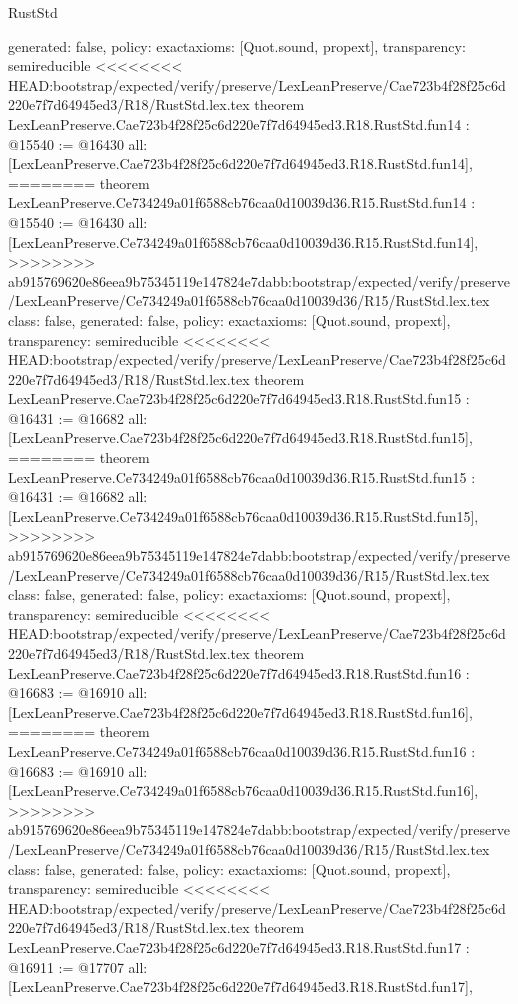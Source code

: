 \begin{lexlean}{RustStd}
\begin{coremodule}
{\begin{coremodule}
{{{{{{{{{{{{{{{{{  generated: false,
  policy: exact{axioms: [Quot.sound, propext]},
  transparency: semireducible
}
<<<<<<<< HEAD:bootstrap/expected/verify/preserve/LexLeanPreserve/Cae723b4f28f25c6d220e7f7d64945ed3/R18/RustStd.lex.tex
theorem LexLeanPreserve.Cae723b4f28f25c6d220e7f7d64945ed3.R18.RustStd.fun14 : @15540 := @16430 {
  all: [LexLeanPreserve.Cae723b4f28f25c6d220e7f7d64945ed3.R18.RustStd.fun14],
========
theorem LexLeanPreserve.Ce734249a01f6588cb76caa0d10039d36.R15.RustStd.fun14 : @15540 := @16430 {
  all: [LexLeanPreserve.Ce734249a01f6588cb76caa0d10039d36.R15.RustStd.fun14],
>>>>>>>> ab915769620e86eea9b75345119e147824e7dabb:bootstrap/expected/verify/preserve/LexLeanPreserve/Ce734249a01f6588cb76caa0d10039d36/R15/RustStd.lex.tex
  class: false,
  generated: false,
  policy: exact{axioms: [Quot.sound, propext]},
  transparency: semireducible
}
<<<<<<<< HEAD:bootstrap/expected/verify/preserve/LexLeanPreserve/Cae723b4f28f25c6d220e7f7d64945ed3/R18/RustStd.lex.tex
theorem LexLeanPreserve.Cae723b4f28f25c6d220e7f7d64945ed3.R18.RustStd.fun15 : @16431 := @16682 {
  all: [LexLeanPreserve.Cae723b4f28f25c6d220e7f7d64945ed3.R18.RustStd.fun15],
========
theorem LexLeanPreserve.Ce734249a01f6588cb76caa0d10039d36.R15.RustStd.fun15 : @16431 := @16682 {
  all: [LexLeanPreserve.Ce734249a01f6588cb76caa0d10039d36.R15.RustStd.fun15],
>>>>>>>> ab915769620e86eea9b75345119e147824e7dabb:bootstrap/expected/verify/preserve/LexLeanPreserve/Ce734249a01f6588cb76caa0d10039d36/R15/RustStd.lex.tex
  class: false,
  generated: false,
  policy: exact{axioms: [Quot.sound, propext]},
  transparency: semireducible
}
<<<<<<<< HEAD:bootstrap/expected/verify/preserve/LexLeanPreserve/Cae723b4f28f25c6d220e7f7d64945ed3/R18/RustStd.lex.tex
theorem LexLeanPreserve.Cae723b4f28f25c6d220e7f7d64945ed3.R18.RustStd.fun16 : @16683 := @16910 {
  all: [LexLeanPreserve.Cae723b4f28f25c6d220e7f7d64945ed3.R18.RustStd.fun16],
========
theorem LexLeanPreserve.Ce734249a01f6588cb76caa0d10039d36.R15.RustStd.fun16 : @16683 := @16910 {
  all: [LexLeanPreserve.Ce734249a01f6588cb76caa0d10039d36.R15.RustStd.fun16],
>>>>>>>> ab915769620e86eea9b75345119e147824e7dabb:bootstrap/expected/verify/preserve/LexLeanPreserve/Ce734249a01f6588cb76caa0d10039d36/R15/RustStd.lex.tex
  class: false,
  generated: false,
  policy: exact{axioms: [Quot.sound, propext]},
  transparency: semireducible
}
<<<<<<<< HEAD:bootstrap/expected/verify/preserve/LexLeanPreserve/Cae723b4f28f25c6d220e7f7d64945ed3/R18/RustStd.lex.tex
theorem LexLeanPreserve.Cae723b4f28f25c6d220e7f7d64945ed3.R18.RustStd.fun17 : @16911 := @17707 {
  all: [LexLeanPreserve.Cae723b4f28f25c6d220e7f7d64945ed3.R18.RustStd.fun17],
}}}}}}}}}}}}}}}}}}}}
\end{coremodule}}
\end{coremodule}
\end{lexlean}
